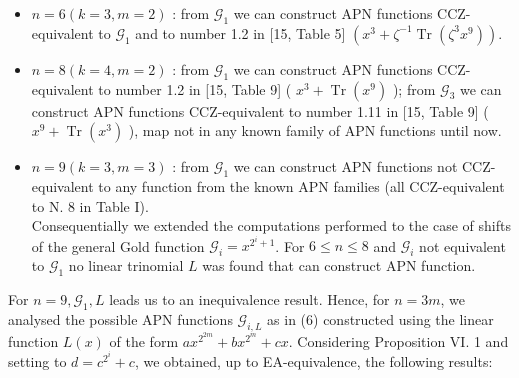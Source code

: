 \documentclass[10pt]{article}
\begin{document}
\begin{itemize}
  \item $n=6(k=3, m=2)$ : from $\mathcal{G}_{1}$ we can construct APN functions CCZ-equivalent to $\mathcal{G}_{1}$ and to number 1.2 in [15, Table 5] $\left(x^{3}+\zeta^{-1} \operatorname{Tr}\left(\zeta^{3} x^{9}\right)\right)$.
  \item $n=8(k=4, m=2)$ : from $\mathcal{G}_{1}$ we can construct APN functions CCZ-equivalent to number 1.2 in [15, Table 9] ( $x^{3}+\operatorname{Tr}\left(x^{9}\right)$ ); from $\mathcal{G}_{3}$ we can construct APN functions CCZ-equivalent to number 1.11 in [15, Table 9] ( $x^{9}+ \operatorname{Tr}\left(x^{3}\right)$ ), map not in any known family of APN functions until now.
  \item $n=9(k=3, m=3)$ : from $\mathcal{G}_{1}$ we can construct APN functions not CCZ-equivalent to any function from the known APN families (all CCZ-equivalent to N. 8 in Table I).\\
Consequentially we extended the computations performed to the case of shifts of the general Gold function $\mathcal{G}_{i}=x^{2^{i}+1}$. For $6 \leq n \leq 8$ and $\mathcal{G}_{i}$ not equivalent to $\mathcal{G}_{1}$ no linear trinomial $L$ was found that can construct APN function.
\end{itemize}

For $n=9, \mathcal{G}_{1}, L$ leads us to an inequivalence result. Hence, for $n=3 m$, we analysed the possible APN functions $\mathcal{G}_{i, L}$ as in (6) constructed using the linear function $L(x)$ of the form $a x^{2^{2 m}}+b x^{2^{m}}+c x$. Considering Proposition VI. 1 and setting to $d=c^{2^{i}}+c$, we obtained, up to EA-equivalence, the following results:
\end{document}
